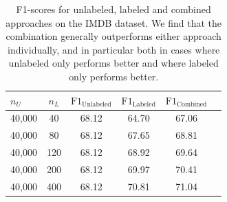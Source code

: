 

\begin{table}[t]
\vskip 0.15in
\renewcommand{\arraystretch}{1.25} %
\begin{center}
\begin{small}
\begin{tabular}{lccccr}
\hline
$n_U$ & $n_L$ & $\text{F1}_\text{Unlabeled}$ & $\text{F1}_\text{Labeled}$ &  $\text{F1}_\text{Combined}$ \\
\hline
40,000 & 40 & 68.12 & 64.70 & 67.06 \\
40,000 & 80 & 68.12 & 67.65 & 68.81 \\
40,000 & 120 & 68.12 & 68.92 & 69.64 \\
40,000 & 200 & 68.12 & 69.97 & 70.41 \\
40,000 & 400 & 68.12 & 70.81 & 71.04 \\
\hline
\end{tabular}
\end{small}
\end{center}
\vskip -0.1in
\caption{F1-scores for unlabeled, labeled and combined approaches on the IMDB dataset. We find that the combination generally outperforms either approach individually, and in particular both in cases where unlabeled only performs better and where labeled only performs better.}
\label{tab:real_combo}
\end{table}


